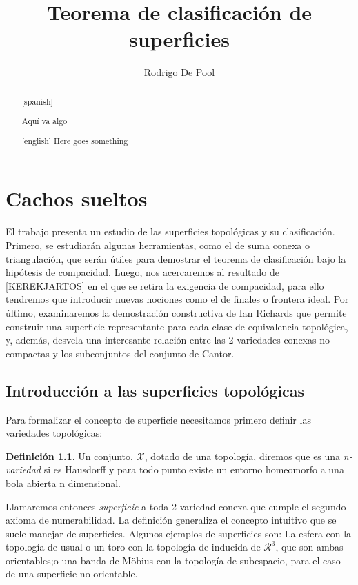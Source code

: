 \documentclass[a4paper,11pt,spanish, twoside, leqno]{tfg-uam}
\title{Teorema de clasificación de superficies}
\author{Rodrigo De Pool}
\theoremstyle{definition}
\newtheorem{defin}[teor]{Definici\'on}
\begin{document}
\begin{abstract}[spanish]

Aquí va algo
\end{abstract}
\begin{abstract}[english]
Here goes something

\end{abstract}


\mainmatter
\chapter{Cachos sueltos}


El trabajo presenta un estudio de las superficies topológicas y su clasificación. Primero, se estudiarán algunas herramientas, como el de suma conexa o triangulación, que serán útiles para demostrar el teorema de clasificación bajo la hipótesis de compacidad. Luego, nos acercaremos al resultado de [KEREKJARTOS] en el que se retira la exigencia de compacidad, para ello tendremos que introducir nuevas nociones como el de finales o frontera ideal. Por último, examinaremos la demostración constructiva de Ian Richards \cite{ian} que permite construir una superficie representante para cada clase de equivalencia topológica, y, además, desvela una interesante relación entre las 2-variedades conexas no compactas y los subconjuntos del conjunto de Cantor.

\section{Introducci\'on a las superficies topológicas}

Para formalizar el concepto de superficie necesitamos primero definir las variedades topológicas:
\begin{defin}
	Un conjunto, $\mathcal{X}$, dotado de una topología, diremos que es una \textit{n-variedad} si es Hausdorff y para todo punto existe un entorno homeomorfo a una bola abierta n dimensional.
\end{defin}

Llamaremos entonces \textit{superficie} a toda 2-variedad conexa que cumple el segundo axioma de numerabilidad. La definición generaliza el concepto intuitivo que se suele manejar de superficies. Algunos ejemplos de superficies son: La esfera con la topología de usual o un toro con la topología de inducida de $\mathcal{R}^3$, que son ambas orientables;o una banda de M\"{o}bius con la topología de subespacio, para el caso de una superficie no orientable.
\end{document}
